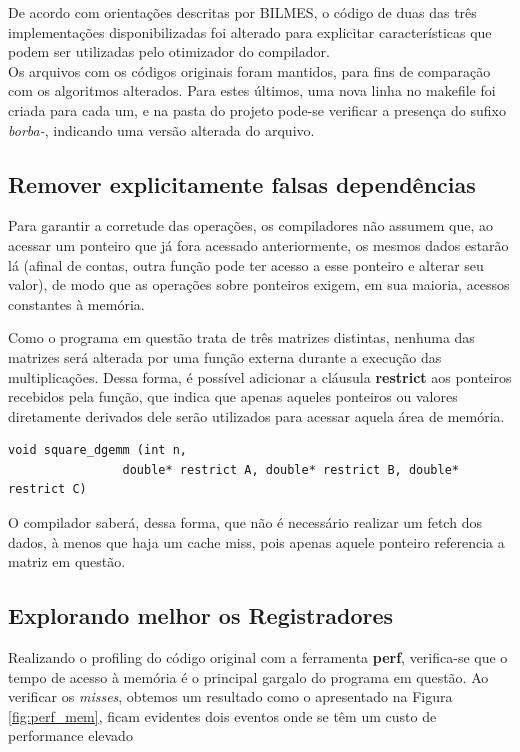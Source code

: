 \documentclass[a4paper,10pt]{article}
\begin{document}
De acordo com orientações descritas por BILMES\cite{bilmes}, o código de duas das três implementações disponibilizadas foi alterado para explicitar características que podem ser utilizadas pelo otimizador do compilador. \\

Os arquivos com os códigos originais foram mantidos, para fins de comparação com os algoritmos alterados. Para estes últimos, uma nova linha no makefile foi criada para cada um, e na pasta do projeto pode-se verificar a presença do sufixo \textit{borba-}, indicando uma versão alterada do arquivo. \\






\subsection{Remover explicitamente falsas dependências}

Para garantir a corretude das operações, os compiladores não assumem que, ao acessar um ponteiro que já fora acessado anteriormente, os mesmos dados estarão lá (afinal de contas, outra função pode ter acesso a esse ponteiro e alterar seu valor), de modo que as operações sobre ponteiros exigem, em sua maioria, acessos constantes à memória. 

Como o programa em questão trata de três matrizes distintas, nenhuma das matrizes será alterada por uma função externa durante a execução das multiplicações. Dessa forma, é possível adicionar a cláusula \textbf{restrict} aos ponteiros recebidos pela função, que indica que apenas aqueles ponteiros ou valores diretamente derivados dele serão utilizados para acessar aquela área de memória. 

\begin{lstlisting}
void square_dgemm (int n, 
                double* restrict A, double* restrict B, double* restrict C)
\end{lstlisting}

O compilador saberá, dessa forma, que não é necessário realizar um fetch dos dados, à menos que haja um cache miss, pois apenas aquele ponteiro referencia a matriz em questão.


\subsection{Explorando melhor os Registradores}


Realizando o profiling do código original com a ferramenta \textbf{perf}, verifica-se que o tempo de acesso à memória é o principal gargalo do programa em questão. Ao verificar os \textit{misses}, obtemos um resultado como o apresentado na Figura \ref{fig:perf_mem}, ficam evidentes dois eventos onde se têm um custo de performance elevado
\end{document}
